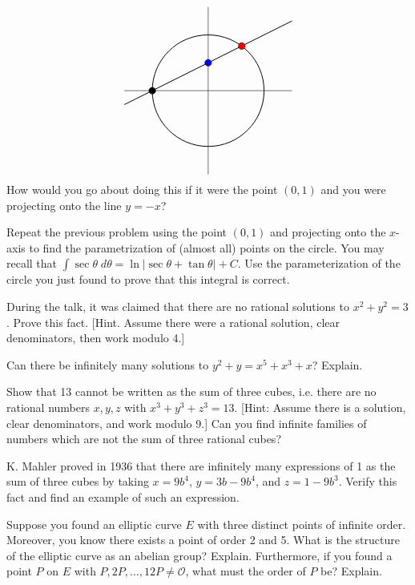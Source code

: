\documentclass[11pt,letterpaper]{article}
\begin{document}
	\[
	\begin{tikzpicture}[scale=1.75]
	\draw (-1.5,0) -- (1.5,0);
	\draw (0,-1.5) -- (0,1.5);

	\draw[line width=0.7] (-1.5,-0.25) -- (1.5,1.25);
	\draw[line width=0.7] (0,0) circle (1);
	
	\draw[fill=black] (-1,0) circle (0.06);
	\draw[fill=blue] (0,0.5) circle (0.06);
	\draw[fill=red] (0.6,0.8) circle (0.06);
	\end{tikzpicture}
	\] 
How would you go about doing this if it were the point $(0, 1)$ and you were projecting onto the line $y= -x$? \pspace

\problem Repeat the previous problem using the point $(0, 1)$ and projecting onto the $x$-axis to find the parametrization of (almost all) points on the circle. You may recall that $\displaystyle \int \sec \theta \;d\theta= \ln|\sec \theta + \tan \theta| + C$. Use the parameterization of the circle you just found to prove that this integral is correct. \pspace

\problem During the talk, it was claimed that there are no rational solutions to $x^2 + y^2= 3$. Prove this fact. [Hint. Assume there were a rational solution, clear denominators, then work modulo 4.] \pspace

\problem Can there be infinitely many solutions to $y^2 + y= x^5 + x^3 + x$? Explain. \pspace

\problem Show that 13 cannot be written as the sum of three cubes, i.e. there are no rational numbers $x, y, z$ with $x^3 + y^3 + z^3= 13$. [Hint: Assume there is a solution, clear denominators, and work modulo 9.] Can you find infinite families of numbers which are not the sum of three rational cubes? \pspace

\problem K. Mahler proved in 1936 that there are infinitely many expressions of 1 as the sum of three cubes by taking $x= 9b^4$, $y= 3b - 9b^4$, and $z= 1 - 9b^3$. Verify this fact and find an example of such an expression. \pspace

\problem Suppose you found an elliptic curve $E$ with three distinct points of infinite order. Moreover, you know there exists a point of order 2 and 5. What is the structure of the elliptic curve as an abelian group? Explain. Furthermore, if you found a point $P$ on $E$ with $P, 2P, \ldots, 12P \neq \mathcal{O}$, what must the order of $P$ be? Explain.
\end{document}
